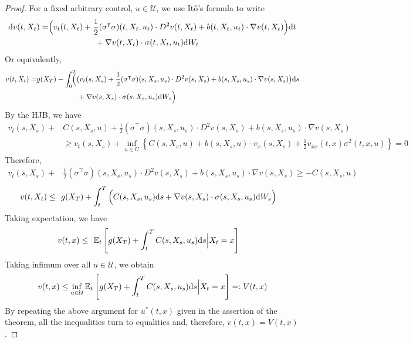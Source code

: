 \documentclass[11pt]{book}
\newcommand{\dd}{\text{\normalfont d}}
\newcommand{\dt}{\text{\normalfont d}t}
\newcommand{\ds}{\text{\normalfont d}s}
\newcommand{\dW}{\text{\normalfont d}W}
\begin{document}
\begin{proof}
    For a fixed arbitrary control, $u\in\mathcal{U}$, we use Itô's formula to write
\[
\begin{split}
    \dd v(t,X_t)  = &\Big(v_t(t,X_t)+\frac12(\sigma^{\intercal}\sigma)(t,X_t,u_t)\cdot D^2 v(t,X_t) + b(t,X_t,u_t)\cdot \nabla v(t,X_t)\Big)\dt \\
    &\hspace{2cm} +  \nabla v(t,X_t)\cdot \sigma(t,X_t,u_t)\dW_t
\end{split}
\]
Or equivalently,
\[
\begin{split}
    v(t,X_t)  = & g(X_T) -\int_0^T\!\!\!\!\!\Big(\big(v_t(s,X_s)+\frac12(\sigma^{\intercal}\sigma)(s,X_s,u_s)\cdot D^2 v(s,X_s) + b(s,X_s,u_s)\cdot \nabla v(s,X_s)\big)\ds \\
    &\hspace{2cm} +  \nabla v(s,X_s)\cdot \sigma(s,X_s,u_s)\dW_s\Big)
\end{split}
\]
By the HJB, we have 
\[
\begin{split}
    v_t(s,X_s)+&C(s,X_s,u)   +\frac12(\sigma^{\intercal}\sigma)(s,X_s,u_s)\cdot D^2 v(s,X_s) + b(s,X_s,u_s)\cdot \nabla v(s,X_s) \\
    &\ge v_t(s,X_s) + \inf_{u\in U}\left\{ C(s,X_s,u)  + b(s,X_s,u)\cdot v_x(s,X_s) +\frac12 v_{xx}(t,x) \sigma^2(t,x,u)\right\}=0
\end{split}
\]
Therefore,
\[
\begin{split}
    v_t(s,X_s)+&\frac12(\sigma^{\intercal}\sigma)(s,X_s,u_s)\cdot D^2 v(s,X_s) + b(s,X_s,u_s)\cdot \nabla v(s,X_s)\ge -C(s,X_s,u)   
\end{split}
\]
\[
\begin{split}
    v(t,X_t) \le~  & ~g(X_T) +\int_t^T\Big(C(s,X_s,u_s)\ds  +  \nabla v(s,X_s)\cdot \sigma(s,X_s,u_s)\dW_s\Big)
\end{split}
\]
Taking expectation, we have 
\[
\begin{split}
    v(t,x) \le ~ & ~\mathbb{E}_t\left[ g(X_T) +\int_t^T C(s,X_s,u_s)\ds \Big|X_t=x\right]
\end{split}
\]
Taking infimum over all $u\in\mathcal{U}$, we obtain
\[
v(t,x) \le  \inf_{u\in\mathcal{U}}\mathbb{E}_t\left[ g(X_T) +\int_t^T C(s,X_s,u_s)\ds\Big| X_t=x\right]=:V(t,x)
\]
By repeating the above argument for $u^*(t,x)$ given in the assertion of the theorem, all the inequalities turn to equalities and,  therefore, $v(t,x)=V(t,x)$.
\end{proof}
\end{document}
